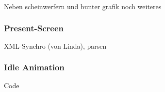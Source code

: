 
Neben scheinwerfern und bunter grafik noch weiteres

\subsubsection{Present-Screen}

XML-Synchro (von Linda), parsen

\subsubsection{Idle Animation}

Code